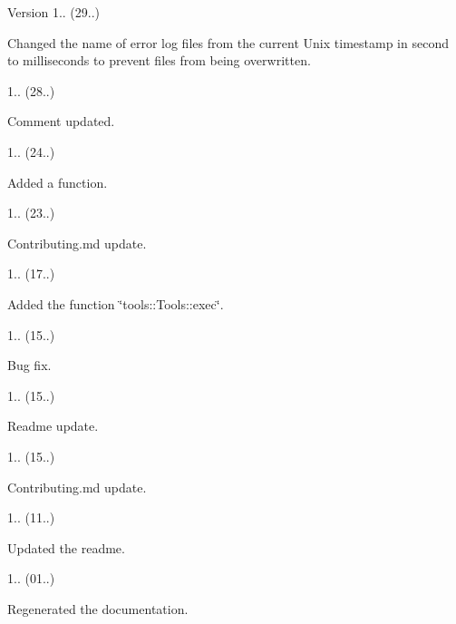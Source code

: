 \begin{DoxyVersion}{Version}
1.. (29..)
\begin{DoxyItemize}
\item Changed the name of error log files from the current Unix timestamp in second to milliseconds to prevent files from being overwritten. 
\end{DoxyItemize}

1.. (28..)
\begin{DoxyItemize}
\item Comment updated. 
\end{DoxyItemize}

1.. (24..)
\begin{DoxyItemize}
\item Added a function. 
\end{DoxyItemize}

1.. (23..)
\begin{DoxyItemize}
\item Contributing.\+md update. 
\end{DoxyItemize}

1.. (17..)
\begin{DoxyItemize}
\item Added the function \char`\"{}tools\+::\+Tools\+::exec\char`\"{}. 
\end{DoxyItemize}

1.. (15..)
\begin{DoxyItemize}
\item Bug fix. 
\end{DoxyItemize}

1.. (15..)
\begin{DoxyItemize}
\item Readme update. 
\end{DoxyItemize}

1.. (15..)
\begin{DoxyItemize}
\item Contributing.\+md update. 
\end{DoxyItemize}

1.. (11..)
\begin{DoxyItemize}
\item Updated the readme. 
\end{DoxyItemize}

1.. (01..)
\begin{DoxyItemize}
\item Regenerated the documentation. 
\end{DoxyItemize}


\end{DoxyVersion}
